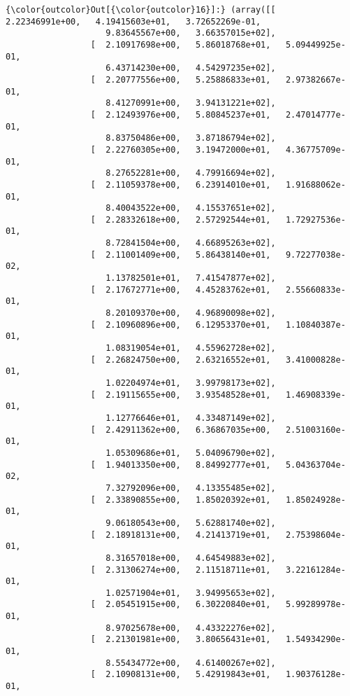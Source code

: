\documentclass[11pt]{article}
\begin{document}
\begin{Verbatim}[commandchars=\\\{\}]
{\color{outcolor}Out[{\color{outcolor}16}]:} (array([[  2.22346991e+00,   4.19415603e+01,   3.72652269e-01,
                    9.83645567e+00,   3.66357015e+02],
                 [  2.10917698e+00,   5.86018768e+01,   5.09449925e-01,
                    6.43714230e+00,   4.54297235e+02],
                 [  2.20777556e+00,   5.25886833e+01,   2.97382667e-01,
                    8.41270991e+00,   3.94131221e+02],
                 [  2.12493976e+00,   5.80845237e+01,   2.47014777e-01,
                    8.83750486e+00,   3.87186794e+02],
                 [  2.22760305e+00,   3.19472000e+01,   4.36775709e-01,
                    8.27652281e+00,   4.79916694e+02],
                 [  2.11059378e+00,   6.23914010e+01,   1.91688062e-01,
                    8.40043522e+00,   4.15537651e+02],
                 [  2.28332618e+00,   2.57292544e+01,   1.72927536e-01,
                    8.72841504e+00,   4.66895263e+02],
                 [  2.11001409e+00,   5.86438140e+01,   9.72277038e-02,
                    1.13782501e+01,   7.41547877e+02],
                 [  2.17672771e+00,   4.45283762e+01,   2.55660833e-01,
                    8.20109370e+00,   4.96890098e+02],
                 [  2.10960896e+00,   6.12953370e+01,   1.10840387e-01,
                    1.08319054e+01,   4.55962728e+02],
                 [  2.26824750e+00,   2.63216552e+01,   3.41000828e-01,
                    1.02204974e+01,   3.99798173e+02],
                 [  2.19115655e+00,   3.93548528e+01,   1.46908339e-01,
                    1.12776646e+01,   4.33487149e+02],
                 [  2.42911362e+00,   6.36867035e+00,   2.51003160e-01,
                    1.05309686e+01,   5.04096790e+02],
                 [  1.94013350e+00,   8.84992777e+01,   5.04363704e-02,
                    7.32792096e+00,   4.13355485e+02],
                 [  2.33890855e+00,   1.85020392e+01,   1.85024928e-01,
                    9.06180543e+00,   5.62881740e+02],
                 [  2.18918131e+00,   4.21413719e+01,   2.75398604e-01,
                    8.31657018e+00,   4.64549883e+02],
                 [  2.31306274e+00,   2.11518711e+01,   3.22161284e-01,
                    1.02571904e+01,   3.94995653e+02],
                 [  2.05451915e+00,   6.30220840e+01,   5.99289978e-01,
                    8.97025678e+00,   4.43322276e+02],
                 [  2.21301981e+00,   3.80656431e+01,   1.54934290e-01,
                    8.55434772e+00,   4.61400267e+02],
                 [  2.10908131e+00,   5.42919843e+01,   1.90376128e-01,

\end{Verbatim}
\end{document}
